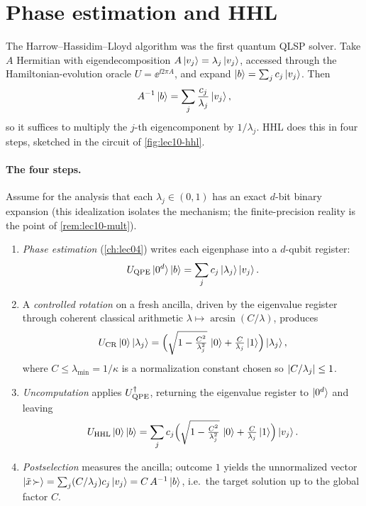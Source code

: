 \section{Phase estimation and HHL}
\label{sec:lec10-2}

The Harrow--Hassidim--Lloyd algorithm was the first quantum QLSP solver. Take $A$
Hermitian with eigendecomposition $A\ket{v_j}=\lambda_j\ket{v_j}$, accessed through the
Hamiltonian-evolution oracle $U=\ee^{\ii2\pi A}$, and expand
$\ket b=\sum_j c_j\ket{v_j}$. Then
\begin{equation}
  A^{-1}\ket b=\sum_j\frac{c_j}{\lambda_j}\ket{v_j},
  \label{eq:lec10-hhl-target}
\end{equation}
so it suffices to multiply the $j$-th eigencomponent by $1/\lambda_j$. HHL does this in
four steps, sketched in the circuit of \cref{fig:lec10-hhl}.

\paragraph{The four steps.}
Assume for the analysis that each $\lambda_j\in(0,1)$ has an exact $d$-bit binary
expansion (this idealization isolates the mechanism; the finite-precision reality is
the point of \cref{rem:lec10-mult}).
\begin{enumerate}[leftmargin=1.6em,nosep]
  \item \emph{Phase estimation} (\cref{ch:lec04}) writes each eigenphase into a
    $d$-qubit register:
    \begin{equation}
      U_{\mathrm{QPE}}\ket{0^d}\ket b=\sum_j c_j\ket{\lambda_j}\ket{v_j}.
      \label{eq:lec10-qpe}
    \end{equation}
  \item A \emph{controlled rotation} on a fresh ancilla, driven by the eigenvalue
    register through coherent classical arithmetic $\lambda\mapsto\arcsin(C/\lambda)$,
    produces
    \begin{equation}
      U_{\mathrm{CR}}\ket0\ket{\lambda_j}
      =\Bigl(\sqrt{1-\tfrac{C^2}{\lambda_j^2}}\,\ket0+\tfrac{C}{\lambda_j}\ket1\Bigr)
        \ket{\lambda_j},
      \label{eq:lec10-cr}
    \end{equation}
    where $C\le\lambda_{\min}=1/\kappa$ is a normalization constant chosen so
    $\left\lvert C/\lambda_j \right\rvert\le1$.
  \item \emph{Uncomputation} applies $U_{\mathrm{QPE}}^{\dagger}$, returning the eigenvalue
    register to $\ket{0^d}$ and leaving
    \begin{equation}
      U_{\mathrm{HHL}}\ket0\ket b
      =\sum_j c_j\Bigl(\sqrt{1-\tfrac{C^2}{\lambda_j^2}}\,\ket0
        +\tfrac{C}{\lambda_j}\ket1\Bigr)\ket{v_j}.
      \label{eq:lec10-hhl}
    \end{equation}
  \item \emph{Postselection} measures the ancilla; outcome $1$ yields the unnormalized
    vector $\ket{\tilde x\!\succ}=\sum_j (C/\lambda_j)c_j\ket{v_j}=C\,A^{-1}\ket b$, i.e.\
    the target solution up to the global factor $C$.
\end{enumerate}

